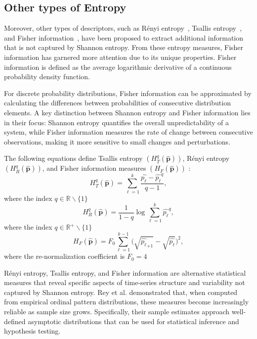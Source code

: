 \subsection{Other types of Entropy}

Moreover, other types of descriptors, such as Rényi entropy~\cite{renyi1961measures}, Tsallis entropy~\cite{tsallis1988possible}, and Fisher information~\cite{frieden2004science}, have been proposed to extract additional information that is not captured by Shannon entropy.
From these entropy measures, Fisher information has garnered more attention due to its unique properties. Fisher information is defined as the average logarithmic derivative of a continuous probability density function.

For discrete probability distributions, Fisher information can be approximated by calculating the differences between probabilities of consecutive distribution elements. A key distinction between Shannon entropy and Fisher information lies in their focus: Shannon entropy quantifies the overall unpredictability of a system, while Fisher information measures the rate of change between consecutive observations, making it more sensitive to small changes and perturbations.

The following equations define Tsallis entropy $	(H_{T}^{q}(\widehat{\mathbf{p}}))$, Rényi entropy $(H_{R}^{q}(\widehat{\mathbf{p}}))$, and Fisher information measures $(H_{F}(\widehat{\mathbf{p}}))$ \cite{sanchez2009discrete} :
\begin{equation}
	H_{T}^{q}(\widehat{\mathbf{p}})=\sum_{\ell=1}^{k}\dfrac{\widehat{p_\ell}-\widehat{p_\ell}^q}{q-1},
\end{equation}
where the index $q\in \mathbb{R}\backslash \{1\}$
\begin{equation}
	H_{R}^{q}(\widehat{\mathbf{p}})=\dfrac{1}{1-q} \log \sum_{\ell=1}^{k}{\widehat{p_\ell}}^q,
\end{equation}
where the index $q\in \mathbb{R}^{+}\backslash \{1\}$
\begin{equation}
	H_F(\widehat{\mathbf{p}})=F_0\sum_{\ell=1}^{k-1}\Big(\sqrt{\widehat{p_\ell}_{+1}}-\sqrt{\widehat{p_\ell}}\Big)^2 ,
\end{equation}
where the re-normalization coefficient is $F_0=4$ \cite{sanchez2009discrete}

Rényi entropy, Tsallis entropy, and Fisher information are alternative statistical measures that reveal specific aspects of time-series structure and variability not captured by Shannon entropy. Rey et al. demonstrated that, when computed from empirical ordinal pattern distributions, these measures become increasingly reliable as sample size grows. Specifically, their sample estimates approach well-defined asymptotic distributions that can be used for statistical inference and hypothesis testing.

